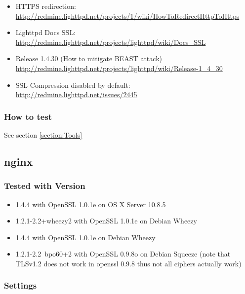 \begin{itemize}
        \item HTTPS redirection: \url{http://redmine.lighttpd.net/projects/1/wiki/HowToRedirectHttpToHttps}
        \item Lighttpd Docs SSL: \url{http://redmine.lighttpd.net/projects/lighttpd/wiki/Docs\_SSL}
        \item Release 1.4.30 (How to mitigate BEAST attack) \url{http://redmine.lighttpd.net/projects/lighttpd/wiki/Release-1\_4\_30}
        \item SSL Compression disabled by default: \url{http://redmine.lighttpd.net/issues/2445}
\end{itemize}




\subsubsection{How to test} 
See section \ref{section:Tools}



\subsection{nginx}

\subsubsection{Tested with Version} 
\begin{itemize}
\item 1.4.4 with OpenSSL 1.0.1e on OS X Server 10.8.5
\item 1.2.1-2.2+wheezy2 with OpenSSL 1.0.1e on Debian Wheezy
\item 1.4.4 with OpenSSL 1.0.1e on Debian Wheezy
\item 1.2.1-2.2~bpo60+2 with OpenSSL 0.9.8o on Debian Squeeze (note that TLSv1.2 does not work in openssl 0.9.8 thus not all ciphers actually work)
\end{itemize}


\subsubsection{Settings}

